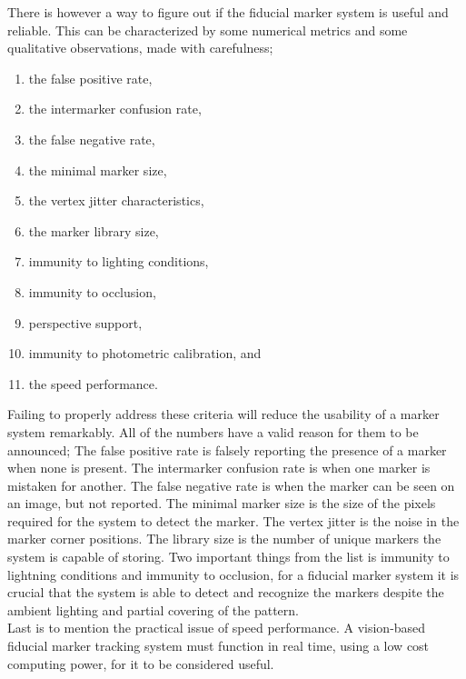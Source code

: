 			There is however a way to figure out if the fiducial marker system is useful and reliable. This can be characterized by some numerical metrics and some qualitative observations, made with carefulness;\\
			\begin{enumerate}
				\item the false positive rate,
				\item the intermarker confusion rate,
				\item the false negative rate,
				\item the minimal marker size,
				\item the vertex jitter characteristics,
				\item the marker library size,
				\item immunity to lighting conditions,
				\item immunity to occlusion,
				\item perspective support,
				\item immunity to photometric calibration, and
				\item the speed performance.\\
			\end{enumerate}
			
			Failing to properly address these criteria will reduce the usability of a marker system remarkably\cite{fiducialMarkers}. All of the numbers have a valid reason for them to be announced; The false positive rate is falsely reporting the presence of a marker when none is present. The intermarker confusion rate is when one marker is mistaken for another. The false negative rate is when the marker can be seen on an image, but not reported. The minimal marker size is the size of the pixels required for the system to detect the marker. The vertex jitter is the noise in the marker corner positions. The library size is the number of unique markers the system is capable of storing. Two important things from the list is immunity to lightning conditions and immunity to occlusion, for a fiducial marker system it is crucial that the system is able to detect and recognize the markers despite the ambient lighting and partial covering of the pattern.\\
			Last is to mention the practical issue of speed performance. A vision-based fiducial marker tracking system must function in real time, using a low cost computing power, for it to be considered useful.\\
			
